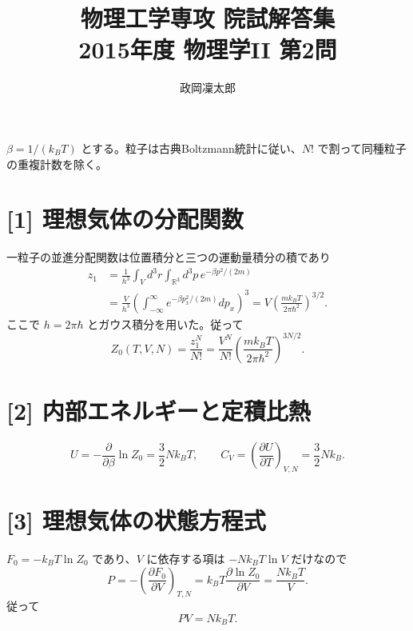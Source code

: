 \documentclass[11pt,a4paper]{article}
\title{物理工学専攻 院試解答集\\2015年度 物理学II 第2問}
\author{政岡凜太郎}
\date{}
\begin{document}
\maketitle

$\beta=1/(k_BT)$ とする。粒子は古典Boltzmann統計に従い、$N!$ で割って同種粒子の重複計数を除く。

\section*{[1] 理想気体の分配関数}
一粒子の並進分配関数は位置積分と三つの運動量積分の積であり
\begin{align}
 z_1&=\frac{1}{h^3}\int_Vd^3r\int_{\mathbb R^3}d^3p\,
 e^{-\beta p^2/(2m)}\\
 &=\frac{V}{h^3}\left(\int_{-\infty}^{\infty}
 e^{-\beta p_x^2/(2m)}dp_x\right)^3
 =V\left(\frac{mk_BT}{2\pi\hbar^2}\right)^{3/2}.
\end{align}
ここで $h=2\pi\hbar$ とガウス積分を用いた。従って
\begin{equation}
 \boxed{Z_0(T,V,N)=\frac{z_1^N}{N!}
 =\frac{V^N}{N!}\left(\frac{mk_BT}{2\pi\hbar^2}\right)^{3N/2}.}
\end{equation}

\section*{[2] 内部エネルギーと定積比熱}
\begin{equation}
 U=-\frac{\partial}{\partial\beta}\ln Z_0
 =\boxed{\frac32Nk_BT},\qquad
 C_V=\left(\frac{\partial U}{\partial T}\right)_{V,N}
 =\boxed{\frac32Nk_B}.
\end{equation}

\section*{[3] 理想気体の状態方程式}
$F_0=-k_BT\ln Z_0$ であり、$V$ に依存する項は $-Nk_BT\ln V$ だけなので
\begin{equation}
 P=-\left(\frac{\partial F_0}{\partial V}\right)_{T,N}
 =k_BT\frac{\partial\ln Z_0}{\partial V}
 =\frac{Nk_BT}{V}.
\end{equation}
従って
\begin{equation}
 \boxed{PV=Nk_BT.}
\end{equation}
\end{document}
